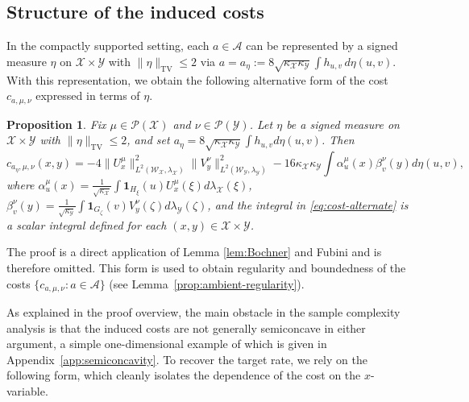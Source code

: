 \documentclass[11pt]{amsart}
\newtheorem{proposition}[theorem]{Proposition}
\theoremstyle{definition}
\theoremstyle{remark}
\newcommand{\cP}{\mathcal{P}}
\newcommand{\1}{\mathbf{1}}
\numberwithin{equation}{section}
\newcommand{\TV}{\mathrm{TV}}
\begin{document}
\subsection{Structure of the induced costs}
\label{sec:cost-structure}
In the compactly supported setting, each $a\in\mathcal A$ can be represented by a signed measure $\eta$ on
$\mathcal X\times\mathcal Y$ with $\|\eta\|_{\TV}\leq2$ via
$a=a_\eta:=8\sqrt{\kappa_\mathcal X\kappa_\mathcal Y}\int h_{u,v}\,d\eta(u,v)$.
With this representation, we obtain the following alternative form of the
cost $c_{a,\mu,\nu}$ expressed in terms of $\eta$.
\begin{proposition} \label{prop:cost-alternate}
    Fix $\mu\in\cP(\mathcal X)$ and $\nu\in\cP(\mathcal Y)$. Let $\eta$ be a signed measure on $\mathcal X\times \mathcal Y$ with $\|\eta\|_{\TV}\le 2$, and set $a_{\eta} = 8\sqrt{\kappa_\mathcal{X}\kappa_\mathcal{Y}}\int h_{u,v} d\eta(u,v)$. Then
\begin{equation} \label{eq:cost-alternate}
c_{a_\eta,\mu,\nu}(x,y)=
-4\|U_x^\mu\|^2_{L^2(\mathcal{W}_\mathcal{X}, \lambda_\mathcal{X})}\|V_y^\nu\|^2_{L^2(\mathcal{W}_\mathcal{Y}, \lambda_\mathcal{Y})}
-
16\kappa_\mathcal{X}\kappa_\mathcal{Y}
\int
\alpha_u^\mu(x)\beta_v^\nu(y) d\eta(u,v),
\end{equation}
where $\alpha_u^\mu(x)=\frac{1}{\sqrt{\kappa_{\mathcal{X}}}}\int \1_{H_\xi}(u)U_x^\mu(\xi)d\lambda_\mathcal{X}(\xi)$, $\beta_v^\nu(y)=\frac{1}{\sqrt{\kappa_{\mathcal{Y}}}}\int\1_{G_\zeta}(v)V_y^\nu(\zeta)d\lambda_\mathcal{Y}(\zeta)$, and the integral in \eqref{eq:cost-alternate} is a scalar integral defined for each $(x,y) \in \mathcal{X} \times \mathcal{Y}$.
\end{proposition}
The proof is a direct application of Lemma \ref{lem:Bochner} and Fubini and is therefore omitted. This form is used to obtain regularity and boundedness of the costs $\{c_{a,\mu,\nu}:a\in\mathcal A\}$ (see Lemma~\ref{prop:ambient-regularity}).

As explained in the proof overview, the main obstacle in the sample
complexity analysis is that the induced costs are not generally semiconcave in either
argument, a simple one-dimensional example of which is given in
Appendix~\ref{app:semiconcavity}. To recover the target rate, we rely on the
following form, which cleanly isolates the dependence of the cost on the
$x$-variable.
\end{document}
